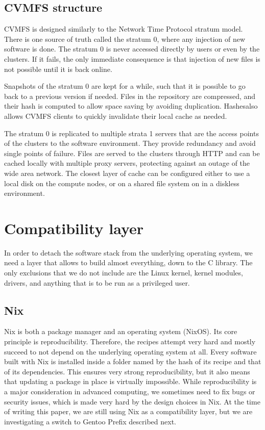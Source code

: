\documentclass[sigconf]{acmart}
\begin{document}
\subsection{CVMFS structure}
\label{sub:CVMFS_structure}
CVMFS is designed similarly to the Network Time Protocol stratum model. There is one source of truth called the stratum 0, where any injection of new software is done.  The stratum 0 is never accessed directly by users or even by the clusters. If it fails, the only immediate consequence is that injection of new files is not possible until it is back online.

Snapshots of the stratum 0 are kept for a while, such that it is possible to go back to a previous version if needed. Files in the repository are compressed, and their hash is computed to allow space saving by avoiding duplication. Hashesalso allows CVMFS clients to quickly invalidate their local cache as needed.

The stratum 0 is replicated to multiple strata 1 servers that are the access points of the clusters to the software environment. They provide redundancy and avoid single points of failure. Files are served to the clusters through HTTP and can be cached locally with multiple proxy servers, protecting against an outage of the wide area network. The closest layer of cache can be configured either to use a local disk on the compute nodes, or on a shared file system on in a diskless environment.

\section{Compatibility layer}
\label{sec:Compatibility_layer}
In order to detach the software stack from the underlying operating system, we need a layer that allows to build almost
everything, down to the C library. The only exclusions that we do not include are the Linux kernel, kernel modules,
drivers, and anything that is to be run as a privileged user.

\subsection{Nix}
\label{sub:Nix}
Nix \cite{Nix} is both a package manager and an operating system (NixOS). Its core principle is reproducibility.
Therefore, the recipes attempt very hard and mostly succeed to not depend on the underlying operating system at all.
Every software built with Nix is installed inside a folder named by the hash of its recipe and that of its
dependencies. This ensures very strong reproducibility, but it also means that updating a package in place is virtually
impossible. While reproducibility is a major consideration in advanced computing, we sometimes need to fix bugs or
security issues, which is made very hard by the design choices in Nix. At the time of writing this paper, we are still
using Nix as a compatibility layer, but we are investigating a switch to Gentoo Prefix described next.
\end{document}
